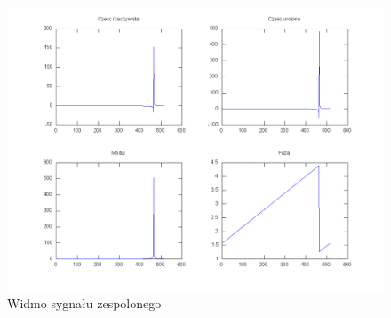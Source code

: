 \documentclass[wide,a4paper,titlepage,12pt]{mwart}
\begin{document}
	\begin{landscape}
	  \begin{figure}[htbp]
	    \begin{center}
	      \includegraphics[scale=.5]{out/fig7.png}
	      \caption{\label{fig7} Widmo sygnału zespolonego}
	    \end{center}
	  \end{figure}
	\end{landscape}
\end{document}
